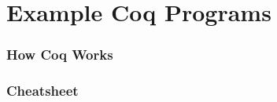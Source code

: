 \documentclass{beamer}
\begin{document}
\section{Example Coq Programs}

\begin{frame}
\frametitle{How Coq Works}
\end{frame}

\begin{frame}
\frametitle{Cheatsheet}
\end{frame}




    





\end{document}
